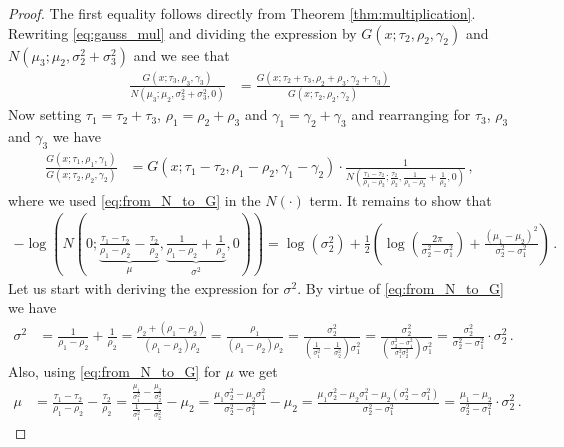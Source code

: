 \documentclass[a4paper]{article}
\begin{document}
\begin{proof}
    The first equality follows directly from Theorem \ref{thm:multiplication}. Rewriting \eqref{eq:gauss_mul} and dividing the expression by $G(x;\tau_2,\rho_2,\gamma_2)$ and $N\left(\mu_3;\mu_2,\sigma_2^2+\sigma_3^2\right)$ and we see that
    \begin{align*}
        \frac{G(x;\tau_3,\rho_3,\gamma_3)}{N\left(\mu_3;\mu_2,\sigma_2^2+\sigma_3^2,0\right)} & = \frac{G(x;\tau_2 + \tau_3,\rho_2 + \rho_3,\gamma_2 + \gamma_3)}{G(x;\tau_2,\rho_2,\gamma_2)}
    \end{align*}
    Now setting $\tau_1 = \tau_2+\tau_3$, $\rho_1 = \rho_2+\rho_3$ and $\gamma_1 = \gamma_2+\gamma_3$ and rearranging for $\tau_3$, $\rho_3$ and $\gamma_3$ we have
    \begin{align*}
        \frac{G(x;\tau_1,\rho_1,\gamma_1)}{G(x;\tau_2,\rho_2,\gamma_2)} & = G(x;\tau_1-\tau_2,\rho_1-\rho_2,\gamma_1-\gamma_2) \cdot \frac{1}{N\left(\frac{\tau_1-\tau_2}{\rho_1-\rho_2};\frac{\tau_2}{\rho_2},\frac{1}{\rho_1-\rho_2}+\frac{1}{\rho_2},0\right)} \,,
    \end{align*}
    where we used \eqref{eq:from_N_to_G} in the $N(\cdot)$ term. It remains to show that
    \begin{align*}
        -\log\left(N\left(0;\underbrace{\frac{\tau_1-\tau_2}{\rho_1-\rho_2}-\frac{\tau_2}{\rho_2}}_{\mu},\underbrace{\frac{1}{\rho_1-\rho_2}+\frac{1}{\rho_2}}_{\sigma^2},0\right)\right) = \log\left(\sigma_2^2\right)+\frac{1}{2}\left(\log\left(\frac{2\pi}{\sigma_2^2-\sigma_1^2}\right) + \frac{\left(\mu_1 - \mu_2\right)^2}{\sigma_2^2-\sigma_1^2}\right) \,.
    \end{align*}
    Let us start with deriving the expression for $\sigma^2$. By virtue of \eqref{eq:from_N_to_G} we have
    \begin{align*}
        \sigma^2 & = \frac{1}{\rho_1 - \rho_2} + \frac{1}{\rho_2} = \frac{\rho_2 + (\rho_1 - \rho_2)}{(\rho_1 - \rho_2)\rho_2} = \frac{\rho_1}{(\rho_1 - \rho_2)\rho_2} = \frac{\sigma_2^2}{\left(\frac{1}{\sigma_1^2} - \frac{1}{\sigma_2^2}\right)\sigma_1^2} = \frac{\sigma_2^2}{\left(\frac{\sigma_2^2 - \sigma_1^2}{\sigma_1^2 \sigma_2^2}\right)\sigma_1^2} = \frac{\sigma_2^2}{\sigma_2^2 - \sigma_1^2} \cdot \sigma_2^2 \,.
    \end{align*}
    Also, using \eqref{eq:from_N_to_G} for $\mu$ we get
    \begin{align*}
        \mu & = \frac{\tau_1-\tau_2}{\rho_1-\rho_2}-\frac{\tau_2}{\rho_2} = \frac{\frac{\mu_1}{\sigma_1^2}-\frac{\mu_2}{\sigma_2^2}}{\frac{1}{\sigma_1^2} - \frac{1}{\sigma_2^2}} -\mu_2 = \frac{\mu_1\sigma_2^2-\mu_2\sigma_1^2}{\sigma_2^2 - \sigma_1^2} - \mu_2 = \frac{\mu_1\sigma_2^2-\mu_2\sigma_1^2 - \mu_2\left(\sigma_2^2 - \sigma_1^2\right)}{\sigma_2^2 - \sigma_1^2} = \frac{\mu_1 - \mu_2}{\sigma_2^2 - \sigma_1^2} \cdot \sigma_2^2 \,.

\end{align*}
\end{proof}
\end{document}
